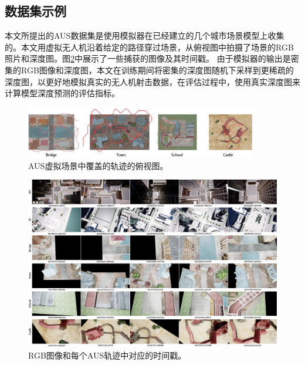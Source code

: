 \begin{appendices}
\section{数据集示例}

本文所提出的AUS数据集是使用模拟器在已经建立的几个城市场景模型\cite{ArtStation, lin_capturing_2022}上收集的。本文用虚拟无人机沿着给定的路径穿过场景，从俯视图中拍摄了场景的RGB照片和深度图。图\ref{fig:supp-example}中展示了一些捕获的图像及其时间戳。
由于模拟器的输出是密集的RGB图像和深度图，本文在训练期间将密集的深度图随机下采样到更稀疏的深度图，以更好地模拟真实的无人机射击数据，在评估过程中，使用真实深度图来计算模型深度预测的评估指标。

\begin{figure}[htbp]
    \centering
    \includegraphics[width=0.9\textwidth]{undergraduate-thesis/images/time-pose function/virtual-top-view.pdf}
    \caption{AUS虚拟场景中覆盖的轨迹的俯视图。}
    \label{fig:virtual-top-view}
\end{figure}

\begin{figure}[htbp]
    \centering
    \includegraphics[width=\textwidth]{undergraduate-thesis/images/time-pose function/data-example.pdf}
    \caption{RGB图像和每个AUS轨迹中对应的时间戳。}
    \label{fig:supp-example}
\end{figure}


\end{appendices}
